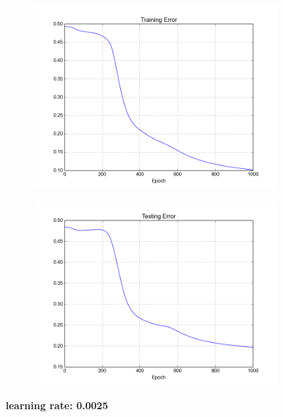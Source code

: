 \begin{figure}[h]	
	\begin{subfigure}[b]{0.5\textwidth}
		\includegraphics[width=\linewidth]{fig/trainingerror_lr0,0025_eps0,05_regparam0,00_beta5_batch1.png}
	\end{subfigure}
	\begin{subfigure}[b]{0.5\textwidth}
		\includegraphics[width=\linewidth]{fig/valerror_lr0,0025_eps0,05_regparam0,00_beta5_batch1.png}
	\end{subfigure}

	\caption{\textbf{learning rate: 0.0025}}
\end{figure}


